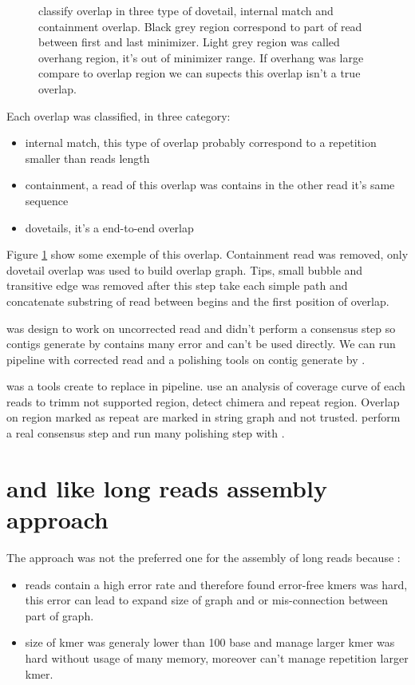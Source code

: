 \documentclass[main]{subfiles}
\begin{document}
\begin{figure}[ht]
    \centering
    
    \caption{\miniasm classify overlap in three type of dovetail, internal match and containment overlap. Black grey region correspond to part of read between first and last minimizer. Light grey region was called overhang region, it's out of minimizer range. If overhang was large compare to overlap region we can supects this overlap isn't a true overlap.}
    \label{sota:fig:miniasm:ovl_classification}
\end{figure}

Each overlap was classified, in three category:
\begin{itemize}
    \item internal match, this type of overlap probably correspond to a repetition smaller than reads length
    \item containment, a read of this overlap was contains in the other read it's same sequence
    \item dovetails, it's a end-to-end overlap
\end{itemize}
Figure \ref{sota:fig:miniasm:ovl_classification} show some exemple of this overlap. Containment read was removed, only dovetail overlap was used to build overlap graph. Tips, small bubble and transitive edge was removed after this step \miniasm take each simple path and concatenate substring of read between begins and the first position of overlap.

\miniasm was design to work on uncorrected read and didn't perform a consensus step so contigs generate by \miniasm contains many error and can't be used directly. We can run \minimap \miniasm pipeline with corrected read and a polishing tools on contig generate by \miniasm. 

\cite{Ra} was a tools create to replace \miniasm in \minimap \miniasm pipeline.  use an analysis of coverage curve of each reads to trimm not supported region, detect chimera and repeat region. Overlap on region marked as repeat are marked in string graph and not trusted.  perform a real consensus step and run many polishing step with .

\section{\DBG and \DBG like long reads assembly approach} \label{section:sota:wtdbg}

The \DBG approach was not the preferred one for the assembly of long reads because :
\begin{itemize}
    \item reads contain a high error rate and therefore found error-free kmers was hard, this error can lead to expand size of graph and or mis-connection between part of graph.
    \item size of kmer was generaly lower than 100 base and manage larger kmer was hard without usage of many memory, moreover \DBG can't manage repetition larger kmer.
\end{itemize}
\end{document}
